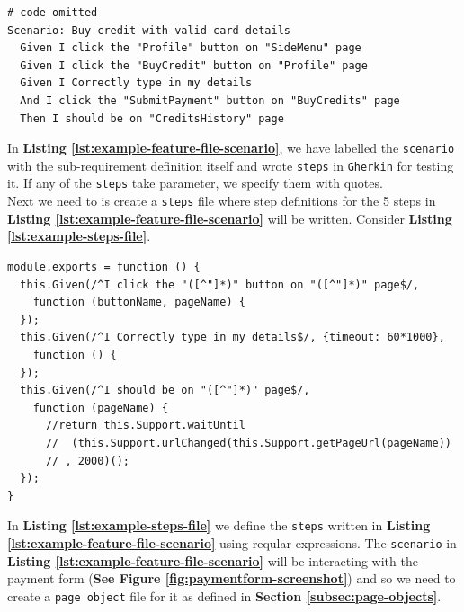 \begin{listing}[H]
\begin{verbatim}
# code omitted
Scenario: Buy credit with valid card details
  Given I click the "Profile" button on "SideMenu" page
  Given I click the "BuyCredit" button on "Profile" page
  Given I Correctly type in my details
  And I click the "SubmitPayment" button on "BuyCredits" page
  Then I should be on "CreditsHistory" page
\end{verbatim}
\label{lst:example-feature-file-scenario}
\end{listing}

In \textbf{Listing \ref{lst:example-feature-file-scenario}}, we have labelled the \texttt{scenario} with the sub-requirement definition itself and wrote \texttt{steps} in \texttt{Gherkin} for testing it. If any of the \texttt{steps} take parameter, we specify them with quotes.\\

Next we need to is create a \texttt{steps} file where step definitions for the 5 steps in \textbf{Listing \ref{lst:example-feature-file-scenario}} will be written. Consider \textbf{Listing \ref{lst:example-steps-file}}.

\begin{listing}[H]
\begin{verbatim}
module.exports = function () {
  this.Given(/^I click the "([^"]*)" button on "([^"]*)" page$/,
    function (buttonName, pageName) {
  });
  this.Given(/^I Correctly type in my details$/, {timeout: 60*1000},
    function () {
  });
  this.Given(/^I should be on "([^"]*)" page$/,
    function (pageName) {
      //return this.Support.waitUntil
      //  (this.Support.urlChanged(this.Support.getPageUrl(pageName))
      // , 2000)();
  });
}
\end{verbatim}
\label{lst:example-steps-file}
\end{listing}

In \textbf{Listing \ref{lst:example-steps-file}} we define the \texttt{steps} written in \textbf{Listing \ref{lst:example-feature-file-scenario}} using reqular expressions. The \texttt{scenario} in \textbf{Listing \ref{lst:example-feature-file-scenario}} will be interacting with the payment form (\textbf{See Figure \ref{fig:paymentform-screenshot}}) and so we need to create a \texttt{page object} file for it as defined in  \textbf{Section \ref{subsec:page-objects}}.

